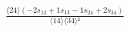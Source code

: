 \documentclass[varwidth, border=5pt]{standalone}
\begin{document}
\begin{my}
$\begin{gathered}
\scriptscriptstyle\frac{⟨24⟩(-2s_{12}+1s_{13}-1s_{24}+2s_{34})}{⟨14⟩⟨34⟩²}
\end{gathered}$
\end{my}
\end{document}
